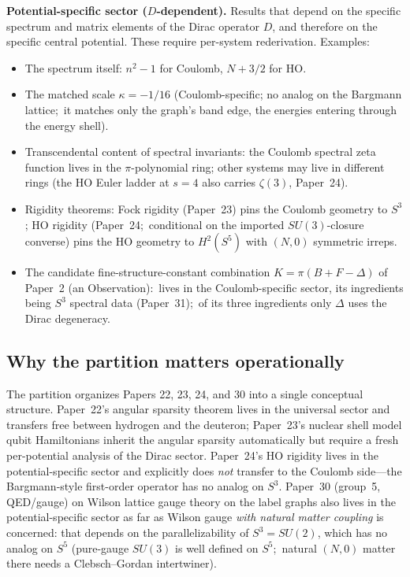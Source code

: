 \documentclass[aps,pra,twocolumn,superscriptaddress,longbibliography]{revtex4-2}
\newcommand{\gvc}[2]{#2}
\begin{document}
\medskip
\noindent\textbf{Potential-specific sector ($D$-dependent).}  Results
that depend on the specific spectrum and matrix elements of the Dirac
operator $D$, and therefore on the specific central potential.  These
require per-system rederivation.  Examples:
\begin{itemize}
\item The spectrum itself: $n^2 - 1$ for Coulomb, $N + 3/2$ for HO.
\item The matched scale $\kappa = -1/16$ (Coulomb-specific; no analog
on the Bargmann lattice;\ it matches only the graph's band edge, the
energies entering through the energy shell).
\item Transcendental content of spectral invariants: the Coulomb
spectral zeta function lives in the $\pi$-polynomial ring; other
systems may live in different rings (the HO Euler ladder at $s = 4$
also carries $\zeta(3)$, Paper~24).
\item Rigidity theorems: Fock rigidity (Paper~23) pins the Coulomb
geometry to $S^3$; HO rigidity (Paper~24;\ conditional on the imported
$SU(3)$-closure converse) pins the HO geometry to
$H^2(S^5)$ with $(N, 0)$ symmetric irreps.
\item \gvc{k-combination-rule}{The candidate fine-structure-constant combination
$K = \pi(B + F - \Delta)$ of Paper~2 (an Observation)}:\ lives in the
Coulomb-specific sector, its ingredients being $S^3$ spectral data
(Paper~31);\ of its three ingredients only $\Delta$ uses the Dirac
degeneracy.
\end{itemize}

\subsection*{Why the partition matters operationally}

The partition organizes Papers 22, 23, 24, and 30 into a single
conceptual structure.  Paper~22's angular sparsity theorem lives in
the universal sector and transfers free between hydrogen and the
deuteron; Paper~23's nuclear shell model qubit Hamiltonians inherit
the angular sparsity automatically but require a fresh per-potential
analysis of the Dirac sector.  Paper~24's HO rigidity lives in the potential-specific sector and
explicitly does \emph{not} transfer to the Coulomb side---the
Bargmann-style first-order operator has no analog on $S^3$.  Paper~30
(group~5, QED/gauge) on Wilson lattice gauge theory on the label graphs
also lives in the potential-specific sector as far as Wilson
gauge \emph{with natural matter coupling} is concerned: that depends on
the parallelizability of $S^3 = SU(2)$, which has no analog on $S^5$
(pure-gauge $SU(3)$ is well defined on $S^5$;\ natural $(N,0)$ matter
there needs a Clebsch--Gordan intertwiner).
\end{document}
